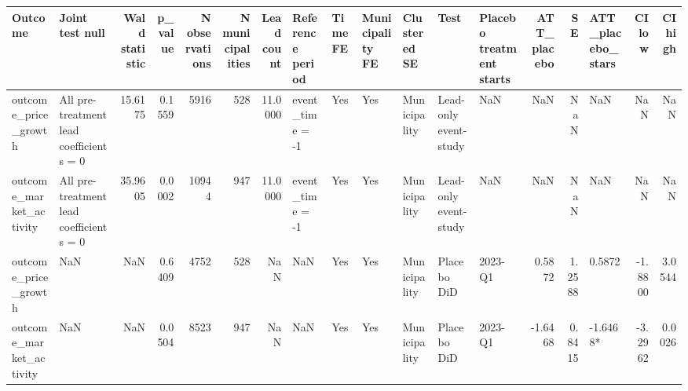 \begin{tabular}{llrrrrrllllllrrlrr}
\toprule
Outcome & Joint test null & Wald statistic & p_value & N observations & N municipalities & Lead count & Reference period & Time FE & Municipality FE & Clustered SE & Test & Placebo treatment starts & ATT_placebo & SE & ATT_placebo_stars & CI low & CI high \\
\midrule
outcome_price_growth & All pre-treatment lead coefficients = 0 & 15.6175 & 0.1559 & 5916 & 528 & 11.0000 & event_time = -1 & Yes & Yes & Municipality & Lead-only event-study & NaN & NaN & NaN & NaN & NaN & NaN \\
outcome_market_activity & All pre-treatment lead coefficients = 0 & 35.9605 & 0.0002 & 10944 & 947 & 11.0000 & event_time = -1 & Yes & Yes & Municipality & Lead-only event-study & NaN & NaN & NaN & NaN & NaN & NaN \\
outcome_price_growth & NaN & NaN & 0.6409 & 4752 & 528 & NaN & NaN & Yes & Yes & Municipality & Placebo DiD & 2023-Q1 & 0.5872 & 1.2588 & 0.5872 & -1.8800 & 3.0544 \\
outcome_market_activity & NaN & NaN & 0.0504 & 8523 & 947 & NaN & NaN & Yes & Yes & Municipality & Placebo DiD & 2023-Q1 & -1.6468 & 0.8415 & -1.6468* & -3.2962 & 0.0026 \\
\bottomrule
\end{tabular}
